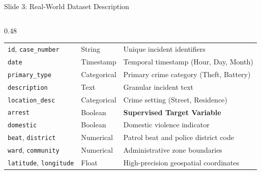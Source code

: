 \documentclass[aspectratio=169]{beamer}
\begin{document}
\begin{frame}{Slide 3: Real-World Dataset Description}
\begin{columns}[T]
\begin{column}{0.48\textwidth}
{\begin{table}
\begin{tabular}{llp{3.2cm}}
                    \midrule
                    \texttt{id}, \texttt{case\_number} & String & Unique incident identifiers \\
                    \texttt{date} & Timestamp & Temporal timestamp (Hour, Day, Month) \\
                    \texttt{primary\_type} & Categorical & Primary crime category (Theft, Battery) \\
                    \texttt{description} & Text & Granular incident text \\
                    \texttt{location\_desc} & Categorical & Crime setting (Street, Residence) \\
                    \texttt{arrest} & Boolean & \textbf{Supervised Target Variable} \\
                    \texttt{domestic} & Boolean & Domestic violence indicator \\
                    \texttt{beat}, \texttt{district} & Numerical & Patrol beat and police district code \\
                    \texttt{ward}, \texttt{community} & Numerical & Administrative zone boundaries \\
                    \texttt{latitude}, \texttt{longitude} & Float & High-precision geospatial coordinates \\
                    \bottomrule
                \end{tabular}
            \end{table}
            }
        \end{column}
    \end{columns}
\end{frame}
\end{document}
